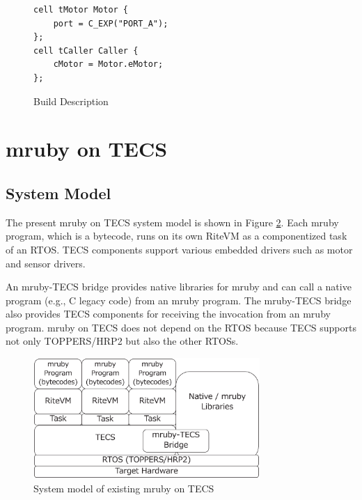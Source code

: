\documentclass[conference]{IEEEtran/IEEEtran/IEEEtran}
\begin{document}
\begin{description}
\begin{figure}[ht]
\centering
\begin{lstlisting}
cell tMotor Motor {
    port = C_EXP("PORT_A");
};
cell tCaller Caller {
    cMotor = Motor.eMotor;
};
\end{lstlisting}
    \vspace{-2mm}
\caption{Build Description}
    \vspace{-2mm}
\label{build}
\end{figure}

\end{description}

\section{mruby on TECS}
\subsection{System Model}
The present mruby on TECS system model is shown in Figure \ref{fig:mrubyontecs}.
Each mruby program, which is a bytecode, runs on its own RiteVM as a componentized task of an RTOS.
TECS components support various embedded drivers such as motor and sensor drivers.

An mruby-TECS bridge provides native libraries for mruby and can call a native program (e.g., C legacy code) from an mruby program.
The mruby-TECS bridge also provides TECS components for receiving the invocation from an mruby program.
mruby on TECS does not depend on the RTOS because TECS supports not only TOPPERS/HRP2 but also the other RTOSs.

\begin{figure}[ht]
    \centering
    \includegraphics[width=8.6cm,clip]{figure/mrubyontecs.eps}
    \vspace{-2mm}
\caption{System model of existing mruby on TECS}
    \vspace{-2mm}
\label{fig:mrubyontecs}
\end{figure}
\end{document}
